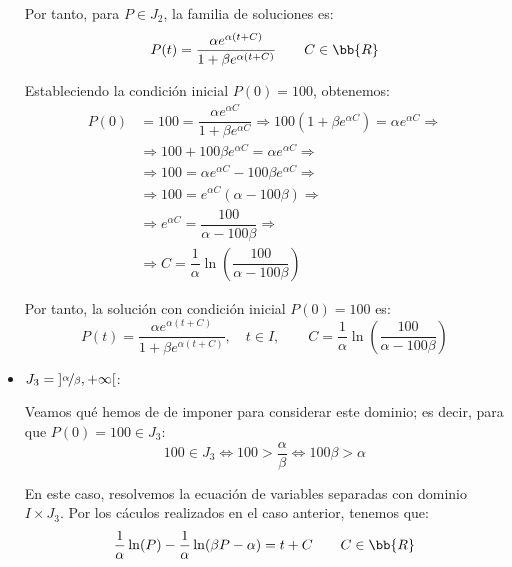 \begin{ejercicio}
\begin{itemize}
        Por tanto, para $P\in J_2$, la familia de soluciones es:
        \begin{equation*}
            P(t) = \dfrac{\alpha e^{\alpha (t + C)}}{1+\beta e^{\alpha (t + C)}} \qquad C\in \bb{R}
        \end{equation*}

        Estableciendo la condición inicial $P(0)=100$, obtenemos:
        \begin{align*}
            P(0) &= 100 = \dfrac{\alpha e^{\alpha C}}{1+\beta e^{\alpha C}} \Longrightarrow 100(1+\beta e^{\alpha C}) = \alpha e^{\alpha C} \Longrightarrow \\ &\Longrightarrow 100 + 100\beta e^{\alpha C} = \alpha e^{\alpha C} \Longrightarrow \\ &\Longrightarrow 100 = \alpha e^{\alpha C} - 100\beta e^{\alpha C} \Longrightarrow \\ &\Longrightarrow 100 = e^{\alpha C}(\alpha - 100\beta) \Longrightarrow \\ &\Longrightarrow e^{\alpha C} = \dfrac{100}{\alpha - 100\beta} \Longrightarrow \\ &\Longrightarrow C =\dfrac{1}{\alpha} \ln\left(\dfrac{100}{\alpha - 100\beta}\right)
        \end{align*}
        
        Por tanto, la solución con condición inicial $P(0)=100$ es:
        \begin{equation*}
            P(t) = \dfrac{\alpha e^{\alpha (t + C)}}{1+\beta e^{\alpha (t + C)}}, \quad t\in I, \qquad C=\dfrac{1}{\alpha}\ln\left(\dfrac{100}{\alpha - 100\beta}\right)
        \end{equation*}

        \item \ul{$J_3=\left]\nicefrac{\alpha}{\beta}, +\infty\right[$}:
        
        Veamos qué hemos de de imponer para considerar este dominio; es decir, para que $P(0)=100\in J_3$:
        \begin{equation*}
            100\in J_3 \Longleftrightarrow 100>\dfrac{\alpha}{\beta} \Longleftrightarrow 100\beta>\alpha
        \end{equation*}

        En este caso, resolvemos la ecuación de variables separadas con dominio $I\times J_3$.
        Por los cáculos realizados en el caso anterior, tenemos que:
        \begin{equation*}
            \dfrac{1}{\alpha} \ln(P) - \dfrac{1}{\alpha} \ln(\beta P - \alpha) = t + C \qquad C\in \bb{R}
        \end{equation*}


\end{itemize}
\end{ejercicio}
